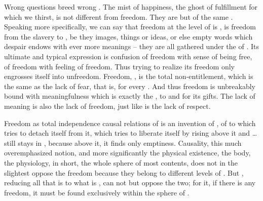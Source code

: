 Wrong questions breed wrong .  The mist of {happiness}, the
ghost of {fulfillment} for which we thirst, is not different from freedom. They
are but  of the same \nexus. Speaking more specifically, we can say
that freedom at the level of  is , is freedom
from the slavery to , be they images, things or ideas, or else empty
words which despair endows with ever more  meanings -- they are all
gathered under the  of . Its ultimate and typical
expression is confusion of freedom with  sense of being free, of freedom
with  feeling of freedom. Thus  trying to realize its
freedom only engrosses itself into unfreedom.  Freedom, , is
the total non-entitlement, which is the same as the lack of fear, that is,
 for every . And thus freedom is unbreakably bound with
meaningfulness which is exactly the ,  to
 and  for its gifts. The lack of meaning
is also the lack of freedom, just like is the lack of respect.



\pa \act %
Freedom as total independence  causal relations of
 is an invention of , of  to
 which tries to {detach} itself from it, which tries to
liberate itself by rising above it and \ldots still stays in ,
because above it, it finds only emptiness.  Causality, this much
overemphasized notion, and more significantly the physical existence, the
body, the physiology, in short, the whole sphere of most 
contents, does not in the slightest oppose the freedom because
they belong to different levels of . But ,
reducing all that is to what is , can not but oppose the two; for
it, if there is any freedom, it must be found exclusively within the sphere of
.

